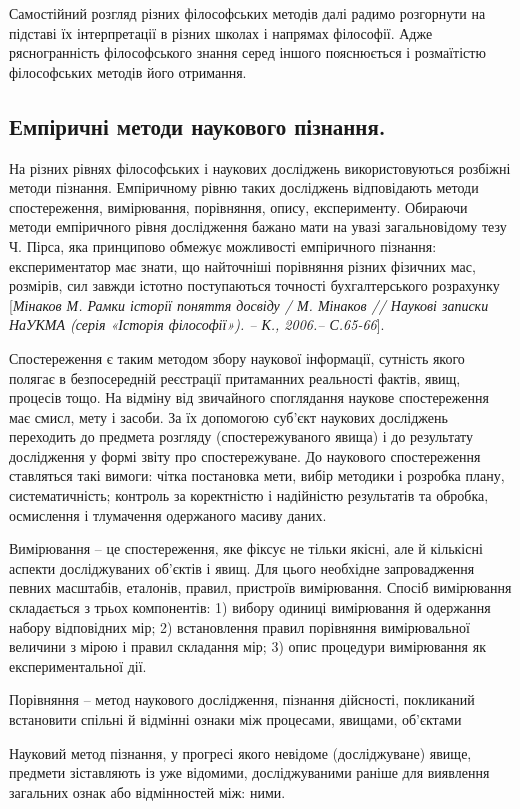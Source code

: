 Самостійний розгляд різних філософських методів далі радимо розгорнути
на підставі їх інтерпретації в різних школах і напрямах філософії. Адже
рясногранність філософського знання серед іншого пояснюється і розмаїтістю
філософських методів його отримання.

\subsection{Емпіричні методи наукового пізнання.} На різних рівнях філософських і
наукових досліджень використовуються розбіжні методи пізнання.
Емпіричному рівню таких досліджень відповідають методи спостереження,
вимірювання, порівняння, опису, експерименту. Обираючи методи емпіричного
рівня дослідження бажано мати на увазі загальновідому тезу Ч. Пірса, яка
принципово обмежує можливості емпіричного пізнання: експериментатор має
знати, що найточніші порівняння різних фізичних мас, розмірів, сил завжди
істотно поступаються точності бухгалтерського розрахунку [\textit{Мінаков М. Рамки
історії поняття досвіду / М. Мінаков // Наукові записки НаУКМА (серія
«Історія філософії»). – К., 2006.– С.65-66}].

Спостереження є таким методом збору наукової інформації, сутність якого
полягає в безпосередній реєстрації притаманних реальності фактів, явищ,
процесів тощо. На відміну від звичайного споглядання наукове спостереження
має смисл, мету і засоби. За їх допомогою суб’єкт наукових досліджень
переходить до предмета розгляду (спостережуваного явища) і до результату
дослідження у формі звіту про спостережуване. До наукового спостереження
ставляться такі вимоги: чітка постановка мети, вибір методики і розробка
плану, систематичність; контроль за коректністю і надійністю результатів та
обробка, осмислення і тлумачення одержаного масиву даних.

Вимірювання – це спостереження, яке фіксує не тільки якісні, але й
кількісні аспекти досліджуваних об’єктів і явищ. Для цього необхідне
запровадження певних масштабів, еталонів, правил, пристроїв вимірювання.
Спосіб вимірювання складається з трьох компонентів: 1) вибору одиниці
вимірювання й одержання набору відповідних мір; 2) встановлення правил
порівняння вимірювальної величини з мірою і правил складання мір; 3) опис
процедури вимірювання як експериментальної дії.

Порівняння – метод наукового дослідження, пізнання дійсності, покликаний
встановити спільні й відмінні ознаки між процесами, явищами, об'єктами

Науковий метод пізнання, у прогресі якого невідоме (досліджуване) явище,
предмети зіставляють із уже відомими, досліджуваними раніше для виявлення
загальних ознак або відмінностей між: ними.

